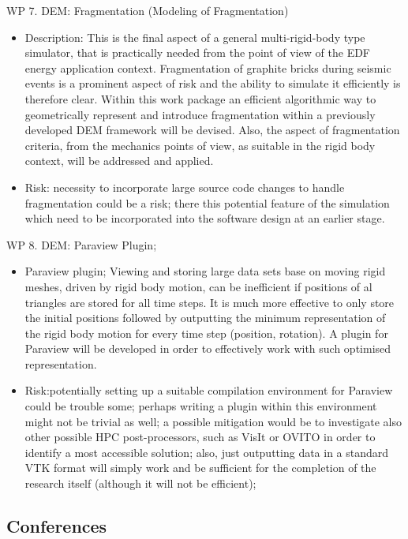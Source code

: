 \documentclass[times,12pt]{ACME2015article}
\begin{document}
WP 7. DEM: Fragmentation (Modeling of Fragmentation)
\begin{itemize}
\item Description: This is the final aspect of a general multi-rigid-body type simulator, that is practically needed from the point of view of the EDF energy application context. Fragmentation of graphite bricks during seismic events is a prominent aspect of risk and the ability to simulate it efficiently is therefore clear. Within this work package an efficient algorithmic way to geometrically represent and introduce fragmentation within a previously developed DEM framework will be devised. Also, the aspect of fragmentation criteria, from the mechanics points of view, as suitable in the rigid body context, will be addressed and applied.
\item Risk: necessity to incorporate large source code changes to handle fragmentation could be a risk; there this potential feature of the simulation which need to be incorporated into the software design at an earlier stage.
\end{itemize}

WP 8. DEM: Paraview Plugin;
\begin{itemize}
\item Paraview plugin; Viewing and storing large data sets base on moving rigid meshes, driven by rigid body motion, can be inefficient if positions of al triangles are stored for all time steps. It is much more effective to only store the initial positions followed by outputting the minimum representation of the rigid body motion for every time step (position, rotation). A plugin for Paraview will be developed in order to effectively work with such optimised representation.
\item Risk:potentially setting up a suitable compilation environment for Paraview could be trouble some; perhaps writing a plugin within this environment might not be trivial as well; a possible mitigation would be to investigate also other possible HPC post-processors, such as VisIt or OVITO in order to identify a most accessible solution; also, just outputting data in a standard VTK format will simply work and be sufficient for the completion of the research itself (although it will not be efficient);
\end{itemize}

\subsection{Conferences}
\end{document}

